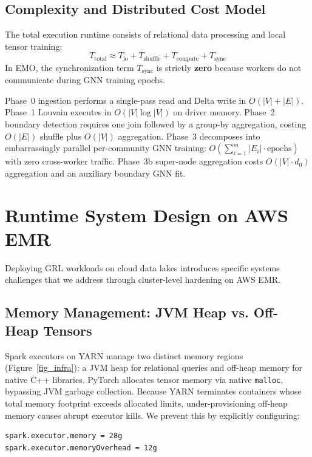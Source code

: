 \documentclass[conference,compsoc]{IEEEtran}
\begin{document}
\subsection{Complexity and Distributed Cost Model}
The total execution runtime consists of relational data processing and local tensor training:
\begin{equation}
T_{\text{total}} \approx T_{\text{io}} + T_{\text{shuffle}} + T_{\text{compute}} + T_{\text{sync}}
\end{equation}
In EMO, the synchronization term $T_{\text{sync}}$ is strictly \textbf{zero} because workers do not communicate during GNN training epochs. 

Phase~0 ingestion performs a single-pass read and Delta write in $O(|V|+|E|)$. Phase~1 Louvain executes in $O(|V| \log |V|)$ on driver memory. Phase~2 boundary detection requires one join followed by a group-by aggregation, costing $O(|E|)$ shuffle plus $O(|V|)$ aggregation. Phase~3 decomposes into embarrassingly parallel per-community GNN training: $O(\sum_{i=1}^{m} |E_i| \cdot \text{epochs})$ with zero cross-worker traffic. Phase~3b super-node aggregation costs $O(|V| \cdot d_0)$ aggregation and an auxiliary boundary GNN fit.

\section{Runtime System Design on AWS EMR}
\label{sec:emr_design}

Deploying GRL workloads on cloud data lakes introduces specific systems challenges that we address through cluster-level hardening on AWS EMR.

\subsection{Memory Management: JVM Heap vs. Off-Heap Tensors}
Spark executors on YARN manage two distinct memory regions (Figure~\ref{fig_infra}): a JVM heap for relational queries and off-heap memory for native C++ libraries. PyTorch allocates tensor memory via native \texttt{malloc}, bypassing JVM garbage collection. Because YARN terminates containers whose total memory footprint exceeds allocated limits, under-provisioning off-heap memory causes abrupt executor kills. We prevent this by explicitly configuring:
\begin{lstlisting}[basicstyle=\footnotesize\ttfamily,columns=fullflexible]
spark.executor.memory = 28g
spark.executor.memoryOverhead = 12g
\end{lstlisting}
\end{document}
